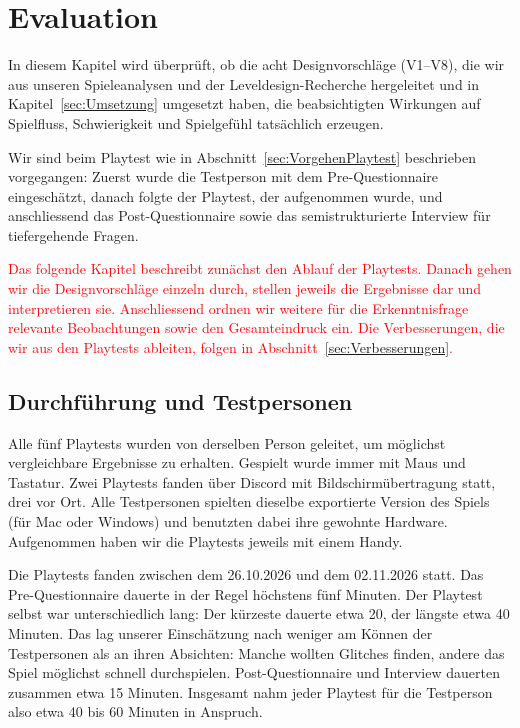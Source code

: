 \documentclass[../Main.tex]{subfiles}
\begin{document}
\section{Evaluation} \label{sec:Evaluation}

In diesem Kapitel wird überprüft, ob die acht Designvorschläge (V1--V8), die wir aus unseren Spieleanalysen und der Leveldesign-Recherche hergeleitet und in Kapitel~\ref{sec:Umsetzung} umgesetzt haben, die beabsichtigten Wirkungen auf Spielfluss, Schwierigkeit und Spielgefühl tatsächlich erzeugen.

Wir sind beim Playtest wie in Abschnitt~\ref{sec:VorgehenPlaytest} beschrieben vorgegangen: Zuerst wurde die Testperson mit dem Pre-Questionnaire eingeschätzt, danach folgte der Playtest, der aufgenommen wurde, und anschliessend das Post-Questionnaire sowie das semistrukturierte Interview für tiefergehende Fragen.

\textcolor{red}{Das folgende Kapitel beschreibt zunächst den Ablauf der Playtests. Danach gehen wir die Designvorschläge einzeln durch, stellen jeweils die Ergebnisse dar und interpretieren sie. Anschliessend ordnen wir weitere für die Erkenntnisfrage relevante Beobachtungen sowie den Gesamteindruck ein. Die Verbesserungen, die wir aus den Playtests ableiten, folgen in Abschnitt~\ref{sec:Verbesserungen}.}

\subsection{Durchführung und Testpersonen} \label{sec:Durchfuehrung}

Alle fünf Playtests wurden von derselben Person geleitet, um möglichst vergleichbare Ergebnisse zu erhalten. Gespielt wurde immer mit Maus und Tastatur. Zwei Playtests fanden über Discord mit Bildschirmübertragung statt, drei vor Ort. Alle Testpersonen spielten dieselbe exportierte Version des Spiels (für Mac oder Windows) und benutzten dabei ihre gewohnte Hardware. Aufgenommen haben wir die Playtests jeweils mit einem Handy.

Die Playtests fanden zwischen dem 26.10.2026 und dem 02.11.2026 statt. Das Pre-Questionnaire dauerte in der Regel höchstens fünf Minuten. Der Playtest selbst war unterschiedlich lang: Der kürzeste dauerte etwa 20, der längste etwa 40 Minuten. Das lag unserer Einschätzung nach weniger am Können der Testpersonen als an ihren Absichten: Manche wollten Glitches finden, andere das Spiel möglichst schnell durchspielen. Post-Questionnaire und Interview dauerten zusammen etwa 15 Minuten. Insgesamt nahm jeder Playtest für die Testperson also etwa 40 bis 60 Minuten in Anspruch.
\end{document}
